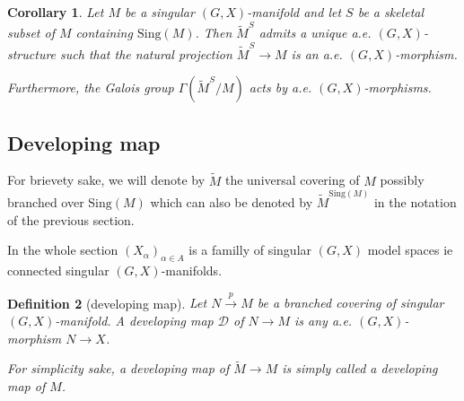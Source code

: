 \documentclass[a4paper,12pt]{article}
\newtheorem{lem}{Lemma}[section]          %
\newtheorem{prop}[lem]{Proposition}
\newtheorem{cor}[lem]{Corollary}
\newtheorem{defi}[lem]{Definition}    %
\def\D{\mathcal{D}}
\def\D{\mathcal{D}}
\def\sing{\mathrm{Sing}}
\def\Reg{\mathrm{Reg}}
\def\reg{\Reg}
\def\sing{\mathrm{Sing}}
\def\reg{\mathrm{Reg}}
\def\D{\mathcal{D}}
\def\Reg{\mathrm{Reg}}
\def\sing{\mathrm{Sing}}
\newcommand{\edt}[1]{{\color{MyDarkRed}{#1}}}
\begin{document}
					\begin{cor}\label{cor:singular_manifold_skeletal_subset} Let $M$ be a singular $(G,X)$-manifold and let $S$ be a skeletal subset of $M$ containing $\sing(M)$. Then $\widetilde M^S$ admits a unique a.e. $(G,X)$-structure such that the natural projection $\widetilde M^S\rightarrow M$ is an a.e. $(G,X)$-morphism.
					
					Furthermore, the Galois group $\Gamma(\widetilde M^S/M)$ acts by a.e. $(G,X)$-morphisms. 
					 
					\end{cor}


\subsection{Developing map}

For brievety sake, we will denote by $\widetilde M$ the universal covering of $M$ possibly branched over $\sing(M)$ which can also be denoted by $\widetilde M^{\sing(M)}$ in the notation of the previous section. 



In the whole section $(X_\alpha)_{\alpha \in A}$ is a familly of singular $(G,X)$ model spaces ie connected singular $(G,X)$-manifolds.  



% 


\begin{defi}[developing map]\label{def:developing_map}
  Let $N\xrightarrow{p} M$ be a branched covering of singular $(G,X)$-manifold.
  A developing map $\D$ of $N\rightarrow M$ is any a.e. $(G,X)$-morphism $N \rightarrow X$. 
  
  For simplicity sake, a developing map of $\widetilde M\rightarrow M$ is simply called a developing map of $M$.
  \end{defi}
\end{document}
